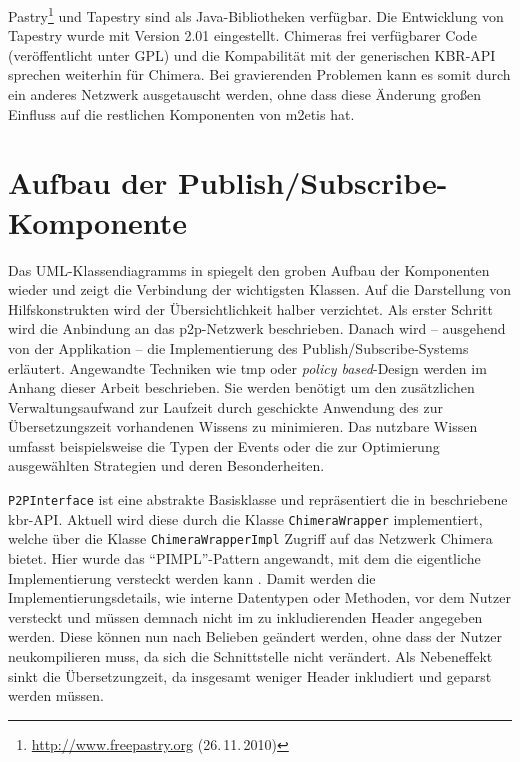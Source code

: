 Pastry\footnote{\url{http://www.freepastry.org} (26.\,11.\,2010)} und Tapestry sind als Java-Bibliotheken verfügbar. Die Entwicklung von Tapestry wurde mit Version 2.01 eingestellt. Chimeras frei verfügbarer Code (veröffentlicht unter GPL) und die Kompabilität mit der generischen KBR-API sprechen weiterhin für Chimera. Bei gravierenden Problemen kann es somit durch ein anderes Netzwerk ausgetauscht werden, ohne dass diese Änderung großen Einfluss auf die restlichen Komponenten von \ac{m2etis} hat. 


\section{Aufbau der Publish/Subscribe-Komponente}

Das UML-Klassendiagramms in  spiegelt den groben Aufbau der Komponenten wieder und zeigt die Verbindung der wichtigsten Klassen. Auf die Darstellung von Hilfskonstrukten wird der Übersichtlichkeit halber verzichtet. Als erster Schritt wird die Anbindung an das \ac{p2p}-Netzwerk beschrieben. Danach wird -- ausgehend von der Applikation -- die Implementierung des Publish/Subscribe-Systems erläutert. Angewandte Techniken wie \ac{tmp} oder \emph{policy based}-Design werden im Anhang dieser Arbeit beschrieben. Sie werden benötigt um den zusätzlichen Verwaltungsaufwand zur Laufzeit durch geschickte Anwendung des zur Übersetzungszeit vorhandenen Wissens zu minimieren. Das nutzbare Wissen umfasst beispielsweise die Typen der Events oder die zur Optimierung ausgewählten Strategien und deren Besonderheiten.

\texttt{P2PInterface} ist eine abstrakte Basisklasse und repräsentiert die in  beschriebene \ac{kbr}-API. Aktuell wird diese durch die Klasse \texttt{ChimeraWrapper} implementiert, welche über die Klasse \texttt{ChimeraWrapperImpl} Zugriff auf das Netzwerk Chimera bietet. Hier wurde das \enquote{PIMPL}-Pattern angewandt, mit dem die eigentliche Implementierung versteckt werden kann \cite{Alexandrescu2001Modern}. Damit werden die Implementierungsdetails, wie interne Datentypen oder Methoden, vor dem Nutzer versteckt und müssen demnach nicht im zu inkludierenden Header angegeben werden. Diese können nun nach Belieben geändert werden, ohne dass der Nutzer neukompilieren muss, da sich die Schnittstelle nicht verändert. Als Nebeneffekt sinkt die Übersetzungzeit, da insgesamt weniger Header inkludiert und geparst werden müssen.

